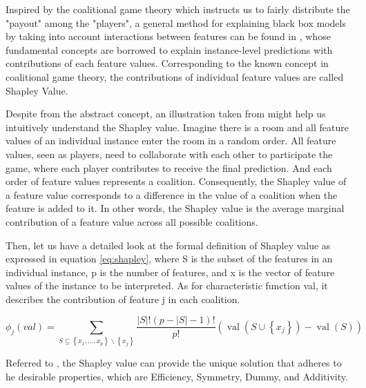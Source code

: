 Inspired by the coalitional game theory which instructs us to fairly distribute the "payout" among the "players", a general method for explaining black box models by taking into account interactions between features can be found in \cite{kononenko2010efficient}, whose fundamental concepts are borrowed to explain instance-level predictions with contributions of each feature values. Corresponding to the known concept in coalitional game theory, the contributions of individual feature values are called Shapley Value.

Despite from the abstract concept, an illustration taken from \cite{molnar2019} might help us intuitively understand the Shapley value. Imagine there is a room and all feature values of an individual instance enter the room in a random order. All feature values, seen as players, need to collaborate with each other to participate the game, where each player contributes to receive the final prediction. And each order of feature values represents a coalition. Consequently, the Shapley value of a feature value corresponds to a difference in the value of a coalition when the feature is added to it. In other words, the Shapley value is the average marginal contribution of a feature value across all possible coalitions. 

Then, let us have a detailed look at the formal definition of Shapley value as expressed in equation \ref{eq:shapley}, where S is the subset of the features in an individual instance, p is the number of features, and x is the vector of feature values of the instance to be interpreted. As for characteristic function val, it describes the contribution of feature j in each coalition.




\begin{equation} \label{eq:shapley}
\phi_{j}(v a l)=\sum_{S \subseteq\left\{x_{1}, \ldots, x_{p}\right\} \backslash\left\{x_{j}\right\}} \frac{|S| !(p-|S|-1) !}{p !}\left(\operatorname{val}\left(S \cup\left\{x_{j}\right\}\right)-\operatorname{val}(S)\right)
\end{equation}

Referred to \cite{shapley1953value}, the Shapley value can provide the unique solution that adheres to he desirable properties, which are Efficiency, Symmetry, Dummy, and Additivity.

